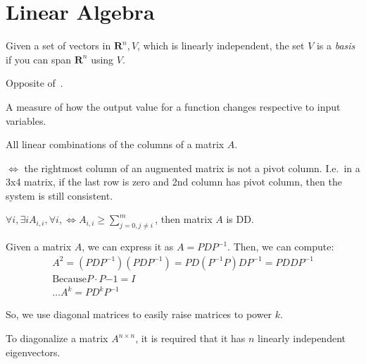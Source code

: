 \section{Linear Algebra}

\begin{definition}[Basis]
    Given a set of vectors in $\mathbf{R}^{n}, V$, which is linearly
    independent, the set $V$ is a \textit{basis} if you can span 
    $\mathbf{R}^{n}$ using $V$.
\end{definition}

\begin{definition}\label{backwardsubstituion}
    Opposite of~.
\end{definition}

\begin{definition}\label{conditionnumber}
    A measure of how the output value for a function changes respective to 
    input variables.
\end{definition}

\begin{definition}
    All linear combinations of the columns of a matrix $A$.
\end{definition}

\begin{definition}[Consistent]
    $\iff$ the rightmost column of an augmented matrix is not a pivot column.
    I.e.\ in a 3x4 matrix, if the last row is zero and 2nd column has pivot
    column, then the system is still consistent.
\end{definition}

\begin{definition}
    $\forall{i}, \exists{i} A_{i, i}, \forall i, \iff A_{i,i} 
    \geq \sum\limits_{j = 0, j\neq i}^{m}$,
    then matrix $A$ is DD.
\end{definition}

\begin{definition}
    Given a matrix $A$, we can express it as $A = PDP^{-1}$.
    Then, we can compute:
    \begin{align}
        A^{2} = (PDP^{-1})(PDP^{-1}) = PD(P^{-1}P)DP^{-1} = PDDP^{-1} \\
        \text{Because} P \cdot P{-1} = I \\
        \dots A^{k} = PD^{k}P^{-1}
    \end{align}

    So, we use diagonal matrices to easily raise matrices to power $k$.
    
    To diagonalize a matrix $A^{n\times{n}}$, it is required that it has $n$ linearly 
    independent eigenvectors.
\end{definition}

